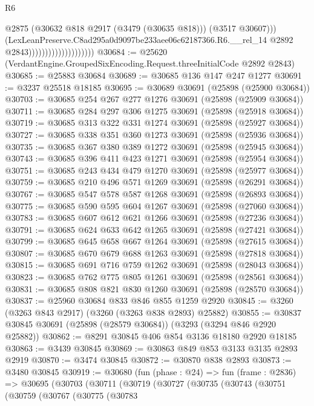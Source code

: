 \begin{lexlean}{R6}
\begin{coremodule}
                                              @2875
                                              (@30632 @818 @2917 (@3479 (@30635 @818)))
                                              (@3517 @30607)))
                                          (LexLeanPreserve.C8ad295a0d9097be233aee06c62187366.R6.__rel_14
                                            @2892
                                            @2843))))))))))))))))))))
@30684 := @25620 (VerdantEngine.GroupedSixEncoding.Request.threeInitialCode @2892 @2843)
@30685 := @25883 @30684
@30689 := @30685 @136 @147 @247 @1277
@30691 := @3237 @25518 @18185
@30695 := @30689 @30691 (@25898 (@25900 @30684))
@30703 := @30685 @254 @267 @277 @1276 @30691 (@25898 (@25909 @30684))
@30711 := @30685 @284 @297 @306 @1275 @30691 (@25898 (@25918 @30684))
@30719 := @30685 @313 @322 @331 @1274 @30691 (@25898 (@25927 @30684))
@30727 := @30685 @338 @351 @360 @1273 @30691 (@25898 (@25936 @30684))
@30735 := @30685 @367 @380 @389 @1272 @30691 (@25898 (@25945 @30684))
@30743 := @30685 @396 @411 @423 @1271 @30691 (@25898 (@25954 @30684))
@30751 := @30685 @243 @434 @479 @1270 @30691 (@25898 (@25977 @30684))
@30759 := @30685 @210 @496 @571 @1269 @30691 (@25898 (@26291 @30684))
@30767 := @30685 @547 @578 @587 @1268 @30691 (@25898 (@26893 @30684))
@30775 := @30685 @590 @595 @604 @1267 @30691 (@25898 (@27060 @30684))
@30783 := @30685 @607 @612 @621 @1266 @30691 (@25898 (@27236 @30684))
@30791 := @30685 @624 @633 @642 @1265 @30691 (@25898 (@27421 @30684))
@30799 := @30685 @645 @658 @667 @1264 @30691 (@25898 (@27615 @30684))
@30807 := @30685 @670 @679 @688 @1263 @30691 (@25898 (@27818 @30684))
@30815 := @30685 @691 @716 @759 @1262 @30691 (@25898 (@28043 @30684))
@30823 := @30685 @762 @775 @805 @1261 @30691 (@25898 (@28561 @30684))
@30831 := @30685 @808 @821 @830 @1260 @30691 (@25898 (@28570 @30684))
@30837 := @25960 @30684 @833 @846 @855 @1259 @2920
@30845 := @3260 (@3263 @843 @2917) (@3260 (@3263 @838 @2893) @25882)
@30855 := @30837 @30845 @30691 (@25898 (@28579 @30684)) (@3293 (@3294 @846 @2920 @25882))
@30862 := @8291 @30845 @406 @854 @3136 @18180 @2920 @18185
@30863 := @3439 @30845
@30869 := @30863 @849 @853 @3133 @3135 @2893 @2919
@30870 := @3474 @30845
@30872 := @30870 @838 @2893
@30873 := @3480 @30845
@30919 := @30680
    (fun (phase : @24) =>
    fun (frame : @2836) =>
    @30695
      (@30703
        (@30711
          (@30719
            (@30727
              (@30735
                (@30743
                  (@30751
                    (@30759
                      (@30767
                        (@30775
                          (@30783

\end{coremodule}
\end{lexlean}

